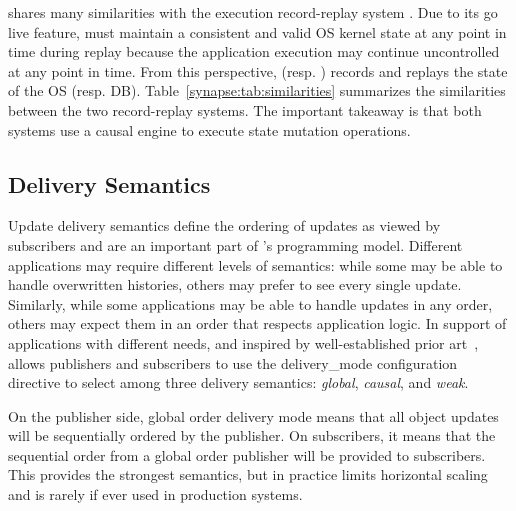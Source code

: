 \synapse shares many similarities with the execution record-replay system \scribe.
Due to its go live feature, \scribe must maintain a consistent and valid OS
kernel state at any point in time during replay because the application
execution may continue uncontrolled at any point in time.
From this perspective, \scribe (resp. \synapse) records and replays the state of
the OS (resp. DB).
Table~\ref{synapse:tab:similarities} summarizes the similarities between the
two record-replay systems. The important takeaway is that both systems use a
causal engine to execute state mutation operations.

\subsection{\synapse Delivery Semantics}
\label{sec:semantics}
Update delivery semantics define the ordering of updates as viewed by subscribers and are an important part of \synapse's
programming model. Different applications may 
require different levels of semantics:  while some may be able to handle overwritten histories,
others may prefer to see every single update.  Similarly, while some
applications may be able to  handle updates in any order, others may expect them in an
order that respects application logic. In support of applications with
different needs, and inspired by well-established prior
art~\cite{Birman:1991:LCA:128738.128742}, \synapse allows
publishers and subscribers to use the {\code delivery\_mode} configuration directive
to select among three delivery semantics: {\em global}, {\em causal},
and {\em weak}. 

On the publisher side, global order delivery mode means that all object
updates will be sequentially ordered by the publisher.  On
subscribers, it means that the sequential order from a global order
publisher will be provided to subscribers.  This provides the
strongest semantics, but in practice limits horizontal scaling and is
rarely if ever used in production systems.  

